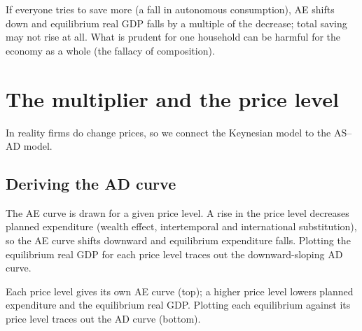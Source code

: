 \begin{remark}
If everyone tries to save more (a fall in autonomous consumption), AE shifts down and
equilibrium real GDP falls by a multiple of the decrease; total saving may not rise at
all. What is prudent for one household can be harmful for the economy as a whole (the
fallacy of composition).
\end{remark}

\section{The multiplier and the price level}

In reality firms do change prices, so we connect the Keynesian model to the AS--AD model.

\subsection{Deriving the AD curve}

The AE curve is drawn for a given price level. A rise in the price level decreases
planned expenditure (wealth effect, intertemporal and international substitution), so the
AE curve shifts downward and equilibrium expenditure falls. Plotting the equilibrium real
GDP for each price level traces out the downward-sloping AD curve.

\begin{center}
\end{center}
Each price level gives its own AE curve (top); a higher price level lowers planned
expenditure and the equilibrium real GDP. Plotting each equilibrium against its price level
traces out the AD curve (bottom).

